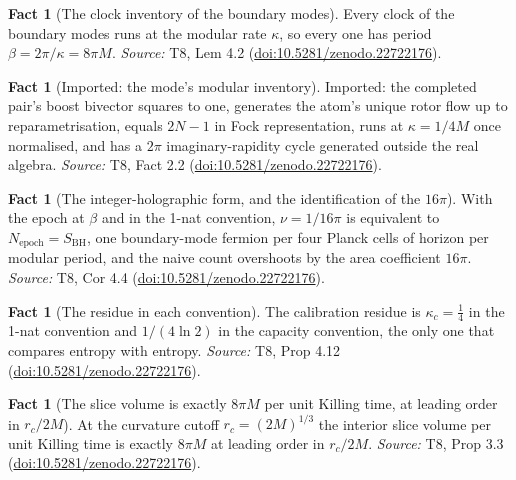 \documentclass[11pt]{article}
\theoremstyle{definition}
\newtheorem{fact}[theorem]{Fact}
\theoremstyle{plain}
\providecommand{\SBH}{}\renewcommand{\SBH}{S_{\mathrm{BH}}}
\begin{document}
\begin{fact}[The clock inventory of the boundary modes]\label{c:scrambling.clock-inventory-boundary-modes}
Every clock of the boundary modes runs at the modular rate $\kappa$, so every one has period $\beta = 2\pi/\kappa = 8\pi M$.
\emph{Source:} T8, Lem 4.2 (\href{https://doi.org/10.5281/zenodo.22722176}{doi:10.5281/zenodo.22722176}).
\end{fact}

\begin{fact}[Imported: the mode's modular inventory]\label{c:scrambling.imported-modes-modular-inventory}
Imported: the completed pair's boost bivector squares to one, generates the atom's unique rotor flow up to reparametrisation, equals $2N - 1$ in Fock representation, runs at $\kappa = 1/4M$ once normalised, and has a $2\pi$ imaginary-rapidity cycle generated outside the real algebra.
\emph{Source:} T8, Fact 2.2 (\href{https://doi.org/10.5281/zenodo.22722176}{doi:10.5281/zenodo.22722176}).
\end{fact}

\begin{fact}[The integer-holographic form, and the identification of the $16\pi$]\label{c:scrambling.integer-holographic-form-identification}
With the epoch at $\beta$ and in the 1-nat convention, $\nu = 1/16\pi$ is equivalent to $N_{\mathrm{epoch}} = \SBH$, one boundary-mode fermion per four Planck cells of horizon per modular period, and the naive count overshoots by the area coefficient $16\pi$.
\emph{Source:} T8, Cor 4.4 (\href{https://doi.org/10.5281/zenodo.22722176}{doi:10.5281/zenodo.22722176}).
\end{fact}

\begin{fact}[The residue in each convention]\label{c:scrambling.residue-each-convention}
The calibration residue is $\kappa_c = \tfrac14$ in the 1-nat convention and $1/(4\ln 2)$ in the capacity convention, the only one that compares entropy with entropy.
\emph{Source:} T8, Prop 4.12 (\href{https://doi.org/10.5281/zenodo.22722176}{doi:10.5281/zenodo.22722176}).
\end{fact}

\begin{fact}[The slice volume is exactly $8\pi M$ per unit Killing time, at leading order in $r_c/2M$]\label{c:scrambling.slice-volume-exactly-per-unit-killing}
At the curvature cutoff $r_c = (2M)^{1/3}$ the interior slice volume per unit Killing time is exactly $8\pi M$ at leading order in $r_c/2M$.
\emph{Source:} T8, Prop 3.3 (\href{https://doi.org/10.5281/zenodo.22722176}{doi:10.5281/zenodo.22722176}).
\end{fact}
\end{document}
